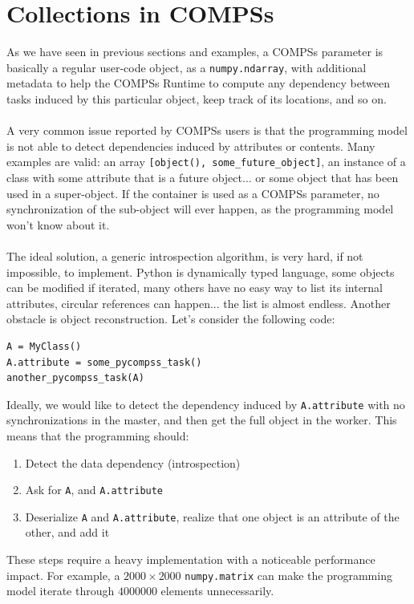 \section{Collections in COMPSs}
\label{sec:col}
As we have seen in previous sections and examples, a COMPSs parameter is basically a regular user-code object, as a \verb|numpy.ndarray|, with additional metadata to help the COMPSs Runtime to compute any dependency between tasks induced by this particular object, keep track of its locations, and so on.\\
\\
A very common issue reported by COMPSs users is that the programming model is not able to detect dependencies induced by attributes or contents. Many examples are valid: an array \verb|[object(), some_future_object]|, an instance of a class with some attribute that is a future object... or some object that has been used in a super-object. If the container is used as a COMPSs parameter, no synchronization of the sub-object will ever happen, as the programming model won't know about it.\\
\\
The ideal solution, a generic introspection algorithm, is very hard, if not impossible, to implement. Python is dynamically typed language, some objects can be modified if iterated, many others have no easy way to list its internal attributes, circular references can happen... the list is almost endless. Another obstacle is object reconstruction. Let's consider the following code:
\begin{verbatim}
A = MyClass()
A.attribute = some_pycompss_task()
another_pycompss_task(A)
\end{verbatim}
Ideally, we would like to detect the dependency induced by \verb|A.attribute| with no synchronizations in the master, and then get the full object in the worker. This means that the programming should:
\begin{enumerate}
\item Detect the data dependency (introspection)
\item Ask for \verb|A|, and \verb|A.attribute|
\item Deserialize \verb|A| and \verb|A.attribute|, realize that one object is an attribute of the other, and add it
\end{enumerate}
These steps require a heavy implementation with a noticeable performance impact. For example, a $2000 \times 2000$ \verb|numpy.matrix| can make the programming model iterate through $4000000$ elements unnecessarily.\\
